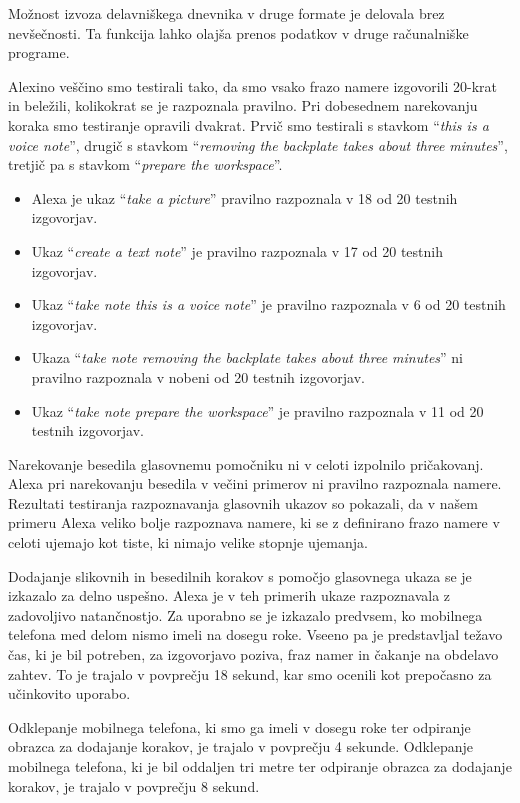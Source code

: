 \documentclass[a4paper, 12pt]{book}
\begin{document}
Možnost izvoza delavniškega dnevnika v druge formate je delovala brez nevšečnosti.
Ta funkcija lahko olajša prenos podatkov v druge računalniške programe.

\bigbreak

Alexino veščino smo testirali tako, da smo vsako frazo namere izgovorili 20-krat in beležili, kolikokrat se je razpoznala pravilno.
Pri dobesednem narekovanju koraka smo testiranje opravili dvakrat.
Prvič smo testirali s stavkom \enquote{\textit{this is a voice note}}, drugič s stavkom \enquote{\textit{removing the backplate takes about three minutes}}, tretjič pa s stavkom \enquote{\textit{prepare the workspace}}.
\begin{itemize}
	\item Alexa je ukaz \enquote{\textit{take a picture}} pravilno razpoznala v 18 od 20 testnih izgovorjav.
	\item Ukaz \enquote{\textit{create a text note}} je pravilno razpoznala v 17 od 20 testnih izgovorjav.
	\item Ukaz \enquote{\textit{take note this is a voice note}} je pravilno razpoznala v 6 od 20 testnih izgovorjav.
	\item Ukaza \enquote{\textit{take note removing the backplate takes about three minutes}} ni pravilno razpoznala v nobeni od 20 testnih izgovorjav.
	\item Ukaz \enquote{\textit{take note prepare the workspace}} je pravilno razpoznala v 11 od 20 testnih izgovorjav.
\end{itemize}
Narekovanje besedila glasovnemu pomočniku ni v celoti izpolnilo pričakovanj.
Alexa pri narekovanju besedila v večini primerov ni pravilno razpoznala namere.
Rezultati testiranja razpoznavanja glasovnih ukazov so pokazali, da v našem primeru Alexa veliko bolje razpoznava namere, ki se z definirano frazo namere v celoti ujemajo kot tiste, ki nimajo velike stopnje ujemanja.

Dodajanje slikovnih in besedilnih korakov s pomočjo glasovnega ukaza se je izkazalo za delno uspešno.
Alexa je v teh primerih ukaze razpoznavala z zadovoljivo natančnostjo.
Za uporabno se je izkazalo predvsem, ko mobilnega telefona med delom nismo imeli na dosegu roke.
Vseeno pa je predstavljal težavo čas, ki je bil potreben, za izgovorjavo poziva, fraz namer in čakanje na obdelavo zahtev.
To je trajalo v povprečju 18 sekund, kar smo ocenili kot prepočasno za učinkovito uporabo.

Odklepanje mobilnega telefona, ki smo ga imeli v dosegu roke ter odpiranje obrazca za dodajanje korakov, je trajalo v povprečju 4 sekunde.
Odklepanje mobilnega telefona, ki je bil oddaljen tri metre ter odpiranje obrazca za dodajanje korakov, je trajalo v povprečju 8 sekund.
\end{document}
